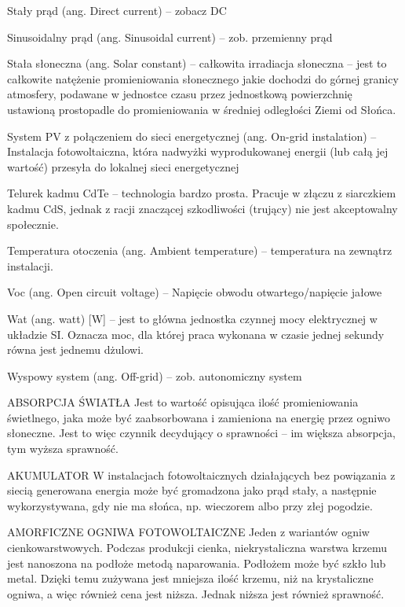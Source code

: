 \documentclass[12pt,a4paper]{article}
\begin{document}
Stały prąd (ang. Direct current) – zobacz DC

Sinusoidalny prąd (ang. Sinusoidal current) – zob. przemienny prąd

Stała słoneczna (ang. Solar constant) – całkowita irradiacja słoneczna – jest to całkowite natężenie promieniowania słonecznego jakie dochodzi do górnej granicy atmosfery, podawane w jednostce czasu przez jednostkową powierzchnię ustawioną prostopadle do promieniowania w średniej odległości Ziemi od Słońca.

System PV z połączeniem do sieci energetycznej (ang. On-grid instalation)  – Instalacja fotowoltaiczna, która nadwyżki wyprodukowanej energii (lub całą jej wartość) przesyła do lokalnej sieci energetycznej


Telurek kadmu CdTe – technologia bardzo prosta. Pracuje w złączu z siarczkiem kadmu CdS, jednak z racji znaczącej szkodliwości (trujący) nie jest akceptowalny społecznie.

Temperatura otoczenia (ang. Ambient temperature) – temperatura na zewnątrz instalacji.

Voc (ang. Open circuit voltage) – Napięcie obwodu otwartego/napięcie jałowe

Wat (ang. watt) [W] – jest to główna jednostka czynnej mocy elektrycznej w układzie SI. Oznacza moc, dla której praca wykonana w czasie jednej sekundy równa jest jednemu dżulowi.

Wyspowy system (ang. Off-grid) – zob. autonomiczny system


ABSORPCJA ŚWIATŁA
Jest to wartość opisująca ilość promieniowania świetlnego, jaka może być zaabsorbowana i zamieniona na energię przez ogniwo słoneczne. Jest to więc czynnik decydujący o sprawności – im większa absorpcja, tym wyższa sprawność.

AKUMULATOR
W instalacjach fotowoltaicznych działających bez powiązania z siecią generowana energia może być gromadzona jako prąd stały, a następnie wykorzystywana, gdy nie ma słońca, np. wieczorem albo przy złej pogodzie.


AMORFICZNE OGNIWA FOTOWOLTAICZNE
Jeden z wariantów ogniw cienkowarstwowych. Podczas produkcji cienka, niekrystaliczna warstwa krzemu jest nanoszona na podłoże metodą naparowania. Podłożem może być szkło lub metal. Dzięki temu zużywana jest mniejsza ilość krzemu, niż na krystaliczne ogniwa, a więc również cena jest niższa. Jednak niższa jest również sprawność.
\end{document}
